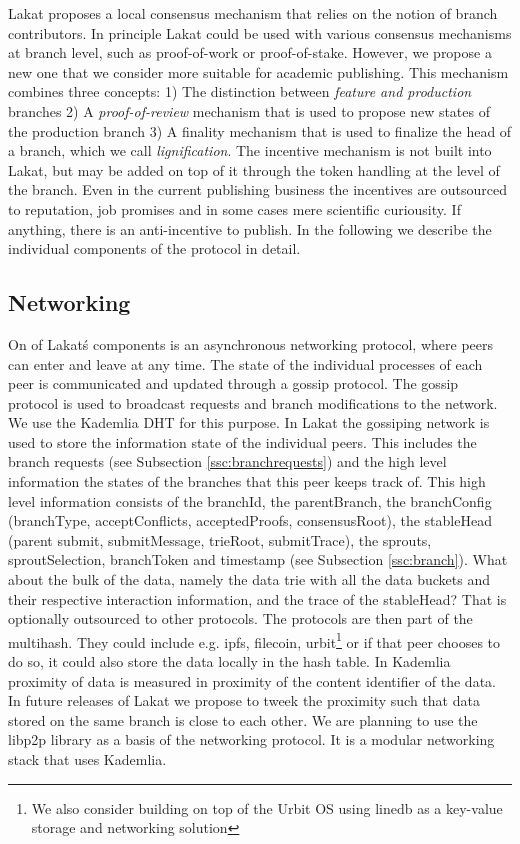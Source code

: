 \documentclass[14pt]{article}
\begin{document}
Lakat proposes a local consensus mechanism that relies on the notion of branch contributors. In principle Lakat could be used with various consensus mechanisms at branch level, such as proof-of-work or proof-of-stake. However, we propose a new one that we consider more suitable for academic publishing. This mechanism combines three concepts: 1) The distinction between \textit{feature and production} branches 2) A \textit{proof-of-review} mechanism that is used to propose new states of the production branch 3) A finality mechanism that is used to finalize the head of a branch, which we call \textit{lignification}. The incentive mechanism is not built into Lakat, but may be added on top of it through the token handling at the level of the branch. Even in the current publishing business the incentives are outsourced to reputation, job promises and in some cases mere scientific curiousity. If anything, there is an anti-incentive to publish. In the following we describe the individual components of the protocol in detail.

\subsection{Networking}
\label{ssc:networking}

On of Lakat\'s components is an asynchronous networking protocol, where peers can enter and leave at any time. The state of the individual processes of each peer is communicated and updated through a gossip protocol. The gossip protocol is used to broadcast requests and branch modifications to the network. We use the Kademlia DHT for this purpose. In Lakat the gossiping network is used to store the information state of the individual peers. This includes the branch requests (see Subsection \ref{ssc:branchrequests}) and the high level information the states of the branches that this peer keeps track of. This high level information consists of the branchId, the parentBranch, the branchConfig (branchType, acceptConflicts, acceptedProofs, consensusRoot), the stableHead (parent submit, submitMessage, trieRoot, submitTrace), the sprouts, sproutSelection, branchToken and timestamp (see Subsection \ref{ssc:branch}). What about the bulk of the data, namely the data trie with all the data buckets and their respective interaction information, and the trace of the stableHead? That is optionally outsourced to other protocols. The protocols are then part of the multihash. They could include e.g. ipfs, filecoin, urbit\footnote{We also consider building on top of the Urbit OS using linedb\cite{linedb} as a key-value storage and networking solution} or if that peer chooses to do so, it could also store the data locally in the hash table. In Kademlia proximity of data is measured in proximity of the content identifier of the data. In future releases of Lakat we propose to tweek the proximity such that data stored on the same branch is close to each other. We are planning to use the libp2p library as a basis of the networking protocol. It is a modular networking stack that uses Kademlia.  
\end{document}
